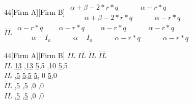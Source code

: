 \documentclass[10.5pt]{article}
\begin{document}
\begin{figure}[ h!]
\begin{center}
\begin{footnotesize}
\begin{game}{4}{4}[Firm A][Firm B]
							  \> $\begin{array}{l}\alpha+\beta-2*r*q \\[0.0mm]\phantom{--}\alpha+\beta-2*r*q \end{array}$
							  \> $\begin{array}{l}\alpha-r*q \\[0.0mm]\phantom{--}\alpha-r*q \end{array}$
							\\$\overline{I}\overline{L}$ 
							 \> $\begin{array}{l}\alpha-r*q \\[0.0mm]\phantom{--}\alpha-I_{o}\end{array}$
							 \> $\begin{array}{l}\alpha-r*q \\[0.0mm]\phantom{--}\alpha-I_{o}\end{array}$
							 \> $\begin{array}{l}\alpha-r*q \\[0.0mm]\phantom{--}\alpha-r*q \end{array}$
							 \>$\begin{array}{l}\alpha-r*q \\[0.0mm]\phantom{--}\alpha-r*q \end{array}$
							  \\
\end{game}
\end{footnotesize}
\end{center}
\end{figure}


\begin{figure}[h!]
\begin{center}
\begin{footnotesize}
\begin{game}{4}{4}[Firm A][Firm B]
       						 \> $IL$  	\> $I\overline{L}$ 	\> $\overline{I}L$  \> $\overline{I}\overline{L}$   \\
$IL$     					 \> \underline{13} ,\underline{13}  	\> \underline{5},5   		,10			\> \underline{5},5  \\
$I\overline{L}$   			 ,\underline{5}  	\> \underline{5},\underline{5}    	\> \underline{5}, 0 				\> \underline{5},0\\
$\overline{I}L$      		 ,\underline{5}  	,\underline{5}    			\> 0,0 					,0  \\
$\overline{I}\overline{L}$   ,\underline{5} 	,\underline{5}   			\> 0,0 					,0 \\
\end{game}
\end{footnotesize}
\end{center}
\end{figure}
\end{document}
